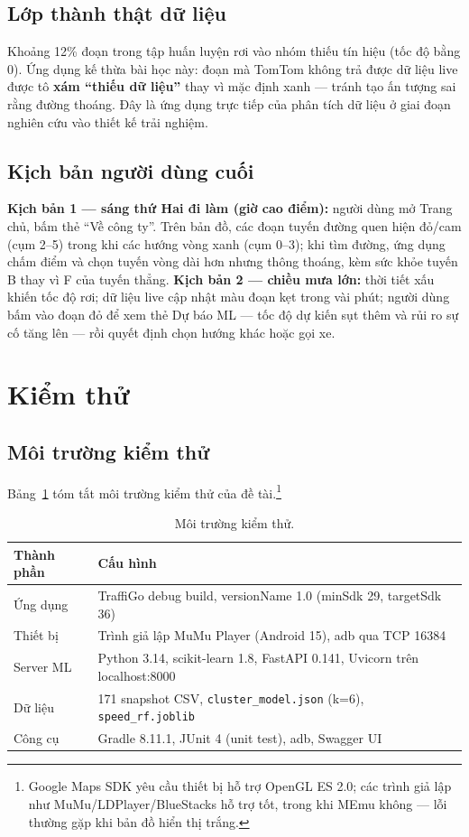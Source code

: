 \subsection{Lớp thành thật dữ liệu}
Khoảng 12\% đoạn trong tập huấn luyện rơi vào nhóm thiếu tín hiệu (tốc độ bằng 0). Ứng dụng kế thừa bài học này: đoạn mà TomTom không trả được dữ liệu live được tô \textbf{xám ``thiếu dữ liệu''} thay vì mặc định xanh --- tránh tạo ấn tượng sai rằng đường thoáng. Đây là ứng dụng trực tiếp của phân tích dữ liệu ở giai đoạn nghiên cứu vào thiết kế trải nghiệm.

\subsection{Kịch bản người dùng cuối}
\textbf{Kịch bản 1 --- sáng thứ Hai đi làm (giờ cao điểm):} người dùng mở Trang chủ, bấm thẻ ``Về công ty''. Trên bản đồ, các đoạn tuyến đường quen hiện đỏ/cam (cụm 2--5) trong khi các hướng vòng xanh (cụm 0--3); khi tìm đường, ứng dụng chấm điểm và chọn tuyến vòng dài hơn nhưng thông thoáng, kèm sức khỏe tuyến B thay vì F của tuyến thẳng.
\textbf{Kịch bản 2 --- chiều mưa lớn:} thời tiết xấu khiến tốc độ rơi; dữ liệu live cập nhật màu đoạn kẹt trong vài phút; người dùng bấm vào đoạn đỏ để xem thẻ Dự báo ML --- tốc độ dự kiến sụt thêm và rủi ro sự cố tăng lên --- rồi quyết định chọn hướng khác hoặc gọi xe.

\section{Kiểm thử}

\subsection{Môi trường kiểm thử}
Bảng~\ref{tab:env} tóm tắt môi trường kiểm thử của đề tài.\footnote{Google Maps SDK yêu cầu thiết bị hỗ trợ OpenGL ES 2.0; các trình giả lập như MuMu/LDPlayer/BlueStacks hỗ trợ tốt, trong khi MEmu không --- lỗi thường gặp khi bản đồ hiển thị trắng.}

\begin{table}[h!]
\centering
\caption{Môi trường kiểm thử.}
\label{tab:env}
\small
\begin{tabularx}{\textwidth}{lX}
\toprule
\textbf{Thành phần} & \textbf{Cấu hình}\\
\midrule
Ứng dụng & TraffiGo debug build, versionName 1.0 (minSdk 29, targetSdk 36)\\
Thiết bị & Trình giả lập MuMu Player (Android 15), adb qua TCP 16384\\
Server ML & Python 3.14, scikit-learn 1.8, FastAPI 0.141, Uvicorn trên localhost:8000\\
Dữ liệu & 171 snapshot CSV, \texttt{cluster\_model.json} (k=6), \texttt{speed\_rf.joblib}\\
Công cụ & Gradle 8.11.1, JUnit 4 (unit test), adb, Swagger UI\\
\bottomrule
\end{tabularx}
\end{table}

